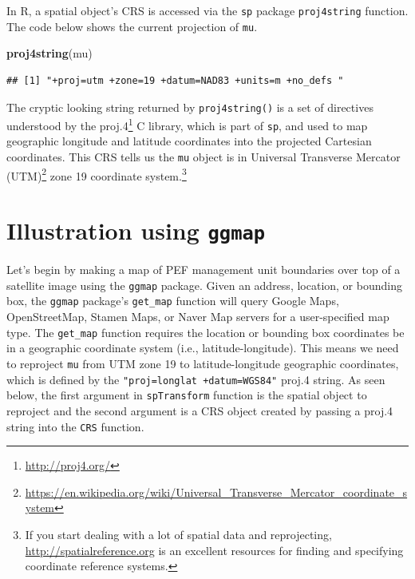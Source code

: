 \documentclass[
]{krantz}
\newenvironment{Shaded}{\begin{snugshade}}{\end{snugshade}}
\newcommand{\KeywordTok}[1]{\textcolor[rgb]{0.13,0.29,0.53}{\textbf{#1}}}
\newcommand{\NormalTok}[1]{#1}
\renewcommand{\href}[2]{#2\footnote{\url{#1}}}
\begin{document}
In R, a spatial object's CRS is accessed via the \texttt{sp} package \texttt{proj4string} function. The code below shows the current projection of \texttt{mu}.

\begin{Shaded}
\begin{Highlighting}[]
\KeywordTok{proj4string}\NormalTok{(mu)}
\end{Highlighting}
\end{Shaded}

\begin{verbatim}
## [1] "+proj=utm +zone=19 +datum=NAD83 +units=m +no_defs "
\end{verbatim}

The cryptic looking string returned by \texttt{proj4string()} is a set of directives understood by the \href{http://proj4.org/}{proj.4} C library, which is part of \texttt{sp}, and used to map geographic longitude and latitude coordinates into the projected Cartesian coordinates. This CRS tells us the \texttt{mu} object is in \href{https://en.wikipedia.org/wiki/Universal_Transverse_Mercator_coordinate_system}{Universal Transverse Mercator (UTM)} zone 19 coordinate system.\footnote{If you start dealing with a lot of spatial data and reprojecting, \url{http://spatialreference.org} is an excellent resources for finding and specifying coordinate reference systems.}

\hypertarget{ggmap}{%
\section{\texorpdfstring{Illustration using \texttt{ggmap}}{Illustration using ggmap}}\label{ggmap}}

Let's begin by making a map of PEF management unit boundaries over top of a satellite image using the \texttt{ggmap} package. Given an address, location, or bounding box, the \texttt{ggmap} package's \texttt{get\_map} function will query Google Maps, OpenStreetMap, Stamen Maps, or Naver Map servers for a user-specified map type. The \texttt{get\_map} function requires the location or bounding box coordinates be in a geographic coordinate system (i.e., latitude-longitude). This means we need to reproject \texttt{mu} from UTM zone 19 to latitude-longitude geographic coordinates, which is defined by the \texttt{\textquotesingle{}"proj=longlat\ +datum=WGS84"\textquotesingle{}} proj.4 string. As seen below, the first argument in \texttt{spTransform} function is the spatial object to reproject and the second argument is a CRS object created by passing a proj.4 string into the \texttt{CRS} function.
\end{document}
